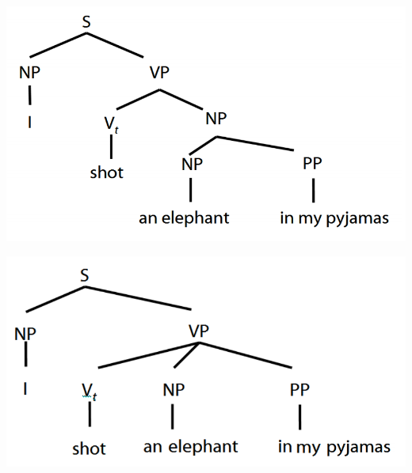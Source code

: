 \documentclass[12pt]{extarticle}
\begin{document}
\begin{multicols*}{3}
\begin{center}
\includegraphics[scale=0.3]{img/groucho1.png}
\end{center}
\begin{center}
\includegraphics[scale=0.3]{img/groucho2.png}
\end{center}
\vfill


 


\end{multicols*}
\end{document}
